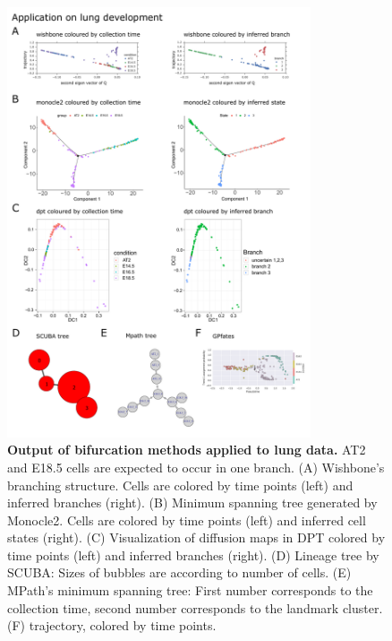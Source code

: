 \begin{figure}
    \centering
    \includegraphics[width=0.8\textwidth]{"results_lung"}
    \caption[Output of bifurcation methods applied to lung data]{\textbf{Output of bifurcation methods applied to lung data.} AT2 and E18.5 cells are expected to occur in one branch. (A) Wishbone's branching structure. Cells are colored by time points (left) and inferred branches (right). (B) Minimum spanning tree generated by Monocle2. Cells are colored by time points (left) and inferred cell states (right). (C) Visualization of diffusion maps in DPT colored by time points (left) and inferred branches (right). (D) Lineage tree by SCUBA: Sizes of bubbles are according to number of cells. (E) MPath's minimum spanning tree: First number corresponds to the collection time, second number corresponds to the landmark cluster. (F)  trajectory, colored by time points.}
    \label{fig:res_lung}
\end{figure}

